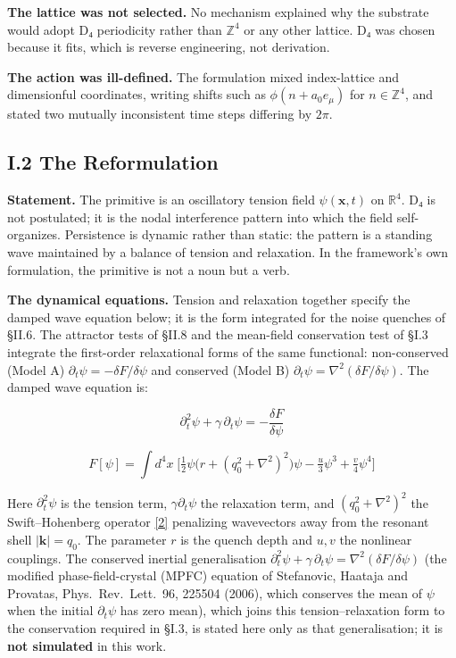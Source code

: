 \documentclass[a4paper,11pt]{article}
\begin{document}
\textbf{The lattice was not selected.} No mechanism explained why the substrate would adopt D₄ periodicity rather than $\mathbb{Z}^4$ or any other lattice. D₄ was chosen because it fits, which is reverse engineering, not derivation.

\textbf{The action was ill-defined.} The formulation mixed index-lattice and dimensionful coordinates, writing shifts such as $\phi(n+a_0e_\mu)$ for $n\in\mathbb{Z}^4$, and stated two mutually inconsistent time steps differing by $2\pi$.

\subsection*{I.2 The Reformulation}

\textbf{Statement.} The primitive is an oscillatory tension field $\psi(\mathbf{x},t)$ on $\mathbb{R}^4$. D₄ is not postulated; it is the nodal interference pattern into which the field self-organizes. Persistence is dynamic rather than static: the pattern is a standing wave maintained by a balance of tension and relaxation. In the framework's own formulation, the primitive is not a noun but a verb.

\textbf{The dynamical equations.} Tension and relaxation together specify the damped wave equation below; it is the form integrated for the noise quenches of §II.6. The attractor tests of §II.8 and the mean-field conservation test of §I.3 integrate the first-order relaxational forms of the same functional: non-conserved (Model A) $\partial_t\psi=-\delta F/\delta\psi$ and conserved (Model B) $\partial_t\psi=\nabla^2(\delta F/\delta\psi)$. The damped wave equation is:

\[\partial_t^2\psi+\gamma\,\partial_t\psi=-\frac{\delta F}{\delta\psi}\]

\[F[\psi]=\int d^4x\;\Big[\tfrac12\psi\big(r+(q_0^2+\nabla^2)^2\big)\psi-\tfrac{u}{3}\psi^3+\tfrac{v}{4}\psi^4\Big]\]

Here $\partial_t^2\psi$ is the tension term, $\gamma\partial_t\psi$ the relaxation term, and $(q_0^2+\nabla^2)^2$ the Swift–Hohenberg operator \hyperref[ref2]{[2]} penalizing wavevectors away from the resonant shell $|\mathbf{k}|=q_0$. The parameter $r$ is the quench depth and $u,v$ the nonlinear couplings. The conserved inertial generalisation $\partial_t^2\psi+\gamma\,\partial_t\psi=\nabla^2(\delta F/\delta\psi)$ (the modified phase-field-crystal (MPFC) equation of Stefanovic, Haataja and Provatas, Phys.\ Rev.\ Lett.\ 96, 225504 (2006), which conserves the mean of $\psi$ when the initial $\partial_t\psi$ has zero mean), which joins this tension–relaxation form to the conservation required in §I.3, is stated here only as that generalisation; it is \textbf{not simulated} in this work.
\end{document}
